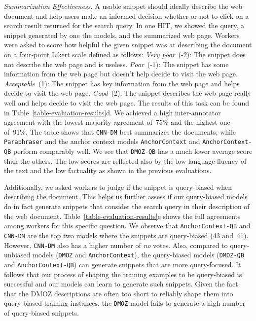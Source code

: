 \documentclass[sigconf]{acmart}
\newcommand{\bslabel}[1]{\textsl{#1.}}
\begin{document}
\bslabel{Summarization Effectiveness}
A usable snippet should ideally describe the web document and help users make an informed decision whether or not to click on a search result returned for the search query. In one HIT, we showed the query, a snippet generated by one the models, and the summarized web page. Workers were asked to score how helpful the given snippet was at describing the document on a four-point Likert scale defined as follows:
\emph{Very poor}~(-2): The snippet does not describe the web page and is useless.
\emph{Poor}~(-1): The snippet has some information from the web page but doesn't help decide to visit the web page.
\emph{Acceptable}~(1): The snippet has key information from the web page and helps decide to visit the web page.
\emph{Good}~(2): The snippet describes the web page really well and helps decide to visit the web page.
The results of this task can be found in Table~\ref{table-evaluation-results}d. We achieved a high inter-annotator agreement with the lowest majority agreement of~75\% and the highest one of~91\%. The table shows that {\small\tt CNN-DM} best summarizes the documents, while {\small\tt Paraphraser} and the anchor context models {\small\tt AnchorContext} and {\small\tt AnchorContext-QB} perform comparably well. We see that {\small\tt DMOZ-QB} has a much lower average score than the others. The low scores are reflected also by the low language fluency of the text and the low factuality as shown in the previous evaluations.

Additionally, we asked workers to judge if the snippet is query-biased when describing the document. This helps us further assess if our query-biased models do in fact generate snippets that consider the search query in their description of the web document. Table~\ref{table-evaluation-results}e shows the full agreements among workers for this specific question. We observe that {\small\tt AnchorContext-QB} and {\small\tt CNN-DM} are the top two models where the snippets are query-biased (43 and~41). However, {\small\tt CNN-DM} also has a higher number of \emph{no} votes. Also, compared to query-unbiased models ({\small\tt DMOZ} and {\small\tt AnchorContext}), the query-biased models ({\small\tt DMOZ-QB} and {\small\tt AnchorContext-QB}) can generate snippets that are more query-focused. It follows that our process of shaping the training examples to be query-biased is successful and our models can learn to generate such snippets. Given the fact that the DMOZ descriptions are often too short to reliably shape them into query-biased training instances, the {\small\tt DMOZ} model fails to generate a high number of query-biased snippets.
\end{document}
